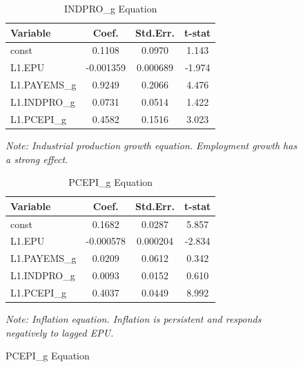 \documentclass[11pt]{article}
\begin{document}
\begin{figure}[H]
\begin{minipage}{0.48\textwidth}
\begin{table}[H]
\centering
\caption{INDPRO\_g Equation}
\label{tab:var_indpro}
\begin{tabular}{lccc}
\hline
Variable & Coef. & Std.Err. & t-stat \\
\hline
const        & 0.1108    & 0.0970   & 1.143 \\
L1.EPU       & -0.001359 & 0.000689 & -1.974 \\
L1.PAYEMS\_g & 0.9249    & 0.2066   & 4.476 \\
L1.INDPRO\_g & 0.0731    & 0.0514   & 1.422 \\
L1.PCEPI\_g  & 0.4582    & 0.1516   & 3.023 \\
\hline
\end{tabular}
\begin{flushleft}
\footnotesize \textit{Note: Industrial production growth equation. Employment growth has a strong effect.}
\end{flushleft}
\end{table}
\end{minipage}
\hfill
\begin{minipage}{0.48\textwidth}
\begin{table}[H]
\centering
\caption{PCEPI\_g Equation}
\label{tab:var_pcepi}
\begin{tabular}{lccc}
\hline
Variable & Coef. & Std.Err. & t-stat \\
\hline
const        & 0.1682    & 0.0287   & 5.857 \\
L1.EPU       & -0.000578 & 0.000204 & -2.834 \\
L1.PAYEMS\_g & 0.0209    & 0.0612   & 0.342 \\
L1.INDPRO\_g & 0.0093    & 0.0152   & 0.610 \\
L1.PCEPI\_g  & 0.4037    & 0.0449   & 8.992 \\
\hline
\end{tabular}
\begin{flushleft}
\footnotesize \textit{Note: Inflation equation. Inflation is persistent and responds negatively to lagged EPU.}
\end{flushleft}
\end{table}
\end{minipage}

\end{figure}
\end{document}
